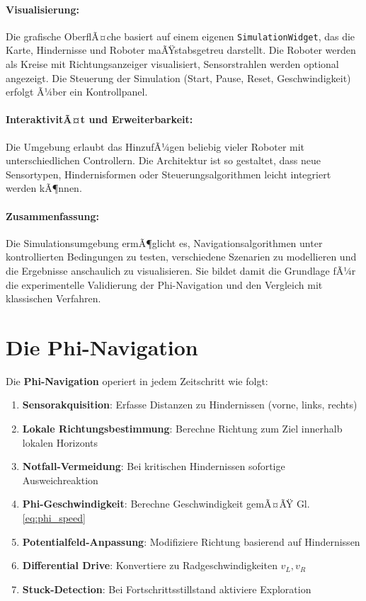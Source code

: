 ﻿\documentclass[a4paper,12pt]{article}
\theoremstyle{definition}
\begin{document}
\paragraph{Visualisierung:}
Die grafische OberflÃ¤che basiert auf einem eigenen \texttt{SimulationWidget}, das die Karte, Hindernisse und Roboter maÃŸstabsgetreu darstellt. Die Roboter werden als Kreise mit Richtungsanzeiger visualisiert, Sensorstrahlen werden optional angezeigt. Die Steuerung der Simulation (Start, Pause, Reset, Geschwindigkeit) erfolgt Ã¼ber ein Kontrollpanel.

\paragraph{InteraktivitÃ¤t und Erweiterbarkeit:}
Die Umgebung erlaubt das HinzufÃ¼gen beliebig vieler Roboter mit unterschiedlichen Controllern. Die Architektur ist so gestaltet, dass neue Sensortypen, Hindernisformen oder Steuerungsalgorithmen leicht integriert werden kÃ¶nnen.

\paragraph{Zusammenfassung:}
Die Simulationsumgebung ermÃ¶glicht es, Navigationsalgorithmen unter kontrollierten Bedingungen zu testen, verschiedene Szenarien zu modellieren und die Ergebnisse anschaulich zu visualisieren. Sie bildet damit die Grundlage fÃ¼r die experimentelle Validierung der Phi-Navigation und den Vergleich mit klassischen Verfahren.

\section{Die Phi-Navigation}

Die \textbf{Phi-Navigation} operiert in jedem Zeitschritt wie folgt:

\begin{enumerate}
	\item[-] \textbf{Sensorakquisition}: Erfasse Distanzen zu Hindernissen (vorne, links, rechts)
	\item[-] \textbf{Lokale Richtungsbestimmung}: Berechne Richtung zum Ziel innerhalb lokalen Horizonts
	\item[-] \textbf{Notfall-Vermeidung}: Bei kritischen Hindernissen sofortige Ausweichreaktion
	\item[-] \textbf{Phi-Geschwindigkeit}: Berechne Geschwindigkeit gemÃ¤ÃŸ Gl. \eqref{eq:phi_speed}
	\item[-] \textbf{Potentialfeld-Anpassung}: Modifiziere Richtung basierend auf Hindernissen
	\item[-] \textbf{Differential Drive}: Konvertiere zu Radgeschwindigkeiten $v_L, v_R$
	\item[-] \textbf{Stuck-Detection}: Bei Fortschrittsstillstand aktiviere Exploration
\end{enumerate}
\end{document}
